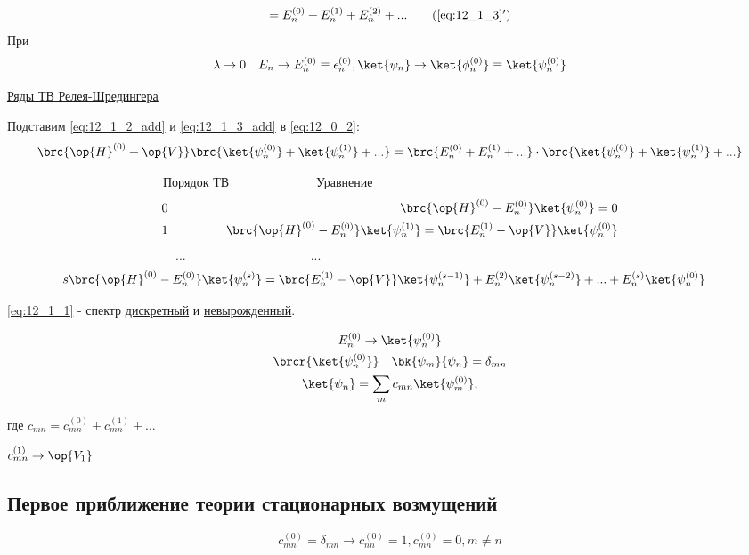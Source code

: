 \begin{equation}
\label{eq:12_1_3_add}
= E_n^{(0)} + E_n^{(1)} + E_n^{(2)} + ...
\tag{\ref{eq:12_1_3}$'$}
\end{equation}
При 
$$
\lambda \to 0 ~~~E_n \to E_n^{(0)} \equiv \epsilon_n^{(0)}, \ket{\psi_n} \to \ket{\phi_n^{(0)}} \equiv \ket{\psi_n^{(0)}}
$$

\underline{Ряды ТВ Релея-Шредингера}

Подставим \eqref{eq:12_1_2_add} и \eqref{eq:12_1_3_add} в \eqref{eq:12_0_2}:
$$
\brc{\op{H}^{(0)} + \op{V}} \brc{\ket{\psi_n^{(0)}} + \ket{\psi_n^{(1)}} + ...} = \brc{E_n^{(0)} + E_n^{(1)} + ...} \cdot \brc{\ket{\psi_n^{(0)}} + \ket{\psi_n^{(1)}} + ...}
$$

~~~~~~~~~~~~~~~~~~~~~~~~~Порядок ТВ~~~~~~~~~~~~~~Уравнение
\begin{eqnarray}
\label{eq:12_1_4} 0 &~~~~~~~~~~~& \brc{\op{H}^{(0)} - E_n^{(0)}} \ket{\psi_n^{(0)}} = 0\\
\label{eq:12_1_5} 1 &~~~~~~~~~~~& \brc{\op{H}^{(0)} - E_n^{(0)}} \ket{\psi_n^{(1)}} = \brc{E_n^{(1)} - \op{V}} \ket{\psi_n^{(0)}} 
\end{eqnarray}
~~~~~~~~~~~~~~~~~~~~~~~~~~~...~~~~~~~~~~~~~~~~~~~~...
\begin{eqnarray}
 \label{eq:12_1_6} s & \brc{\op{H}^{(0)} - E_n^{(0)}} \ket{\psi_n^{(s)}} = \brc{E_n^{(1)} - \op{V}} \ket{\psi_n^{(s-1)}}  + E_n^{(2)}\ket{\psi_n^{(s-2)}}+...+ E_n^{(s)}\ket{\psi_n^{(0)}}
\end{eqnarray}
 
\eqref{eq:12_1_1} - спектр \underline{дискретный} и \underline{невырожденный}.

\begin{gather*}
E_n^{(0)} \to \ket{\psi_n^{(0)}}\\
\brcr{\ket{\psi_n^{(0)}}}~~~\bk{\psi_m}{\psi_n} = \delta_{mn}\\
\ket{\psi_n}= \sum_m c_{mn} \ket{\psi_m^{(0)}}, 
\end{gather*}

где $c_{mn} = c_{mn}^{(0)} + c_{mn}^{(1)} + ...$

$c_{mn}^{(1)} \to \op{V_1}$

\subsection{Первое приближение теории стационарных возмущений}

$$
\boxed{c_{mn}^{(0)} =\delta_{mn}} \to c_{nn}^{(0)} = 1, c_{mn}^{(0)} = 0, m \neq n
$$

